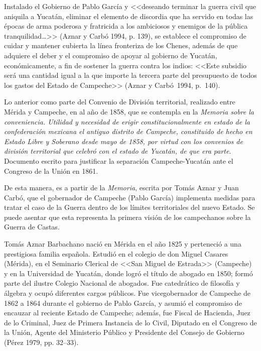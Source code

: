 Instalado el Gobierno de Pablo García y <<deseando terminar la guerra civil
que aniquila a Yucatán,  eliminar el elemento de discordia que ha servido
en todas las épocas de arma poderosa y fratricida a los ambiciosos y
enemigos de la pública tranquilidad\ldots>> (Aznar y Carbó 1994, p.
 139), se establece el compromiso de
cuidar y mantener cubierta la línea fronteriza de los Chenes, además de que
adquiere el deber y el compromiso de apoyar al gobierno de Yucatán,
económicamente, a fin de sostener la guerra contra los indios: <<Este
subsidio será una cantidad igual  a la que importe la tercera parte del
presupuesto de todos los gastos del Estado de Campeche>> (Aznar y Carbó~1994, 
p.~140).


Lo anterior como parte del Convenio de División territorial, realizado 
entre Mérida y Campeche,  en al año de 1858, que se contempla en la
\textit{Memoria sobre la conveniencia. Utilidad y
necesidad de erigir constitucionalmente en estado de la confederación
mexicana el antiguo distrito de Campeche, constituido de hecho en Estado
Libre y Soberano desde mayo de 1858, por virtud con los convenios de
división territorial que celebró con el estado de Yucatán, de que era
parte}. Documento  escrito para justificar la separación Campeche-Yucatán 
ante el Congreso de la Unión en 1861.


De esta manera, es a partir de la \textit{Memoria}, escrita por Tomás Aznar
y Juan Carbó, que el gobernador de Campeche (Pablo García) implementa
medidas para tratar el caso de la Guerra dentro de los límites
territoriales del nuevo Estado. Se puede
asentar que esta representa la primera visión de los campechanos sobre la
Guerra de Castas.


Tomás Aznar Barbachano nació en Mérida en el año 1825 y perteneció a una
prestigiosa familia española. Estudió en el colegio de don Miguel Casares
(Mérida), en el Seminario Clerical de <<San Miguel de Estrada>> (Campeche) y
en la Universidad de Yucatán, donde logró el título de  abogado en 1850;
formó parte del ilustre  Colegio Nacional de abogados. Fue catedrático de
filosofía y álgebra y ocupó diferentes cargos públicos. Fue vicegobernador
de Campeche de 1862 a 1864 durante el gobierno de Pablo García, y asumió el
compromiso de encauzar al reciente Estado de Campeche; además, fue Fiscal
de Hacienda,  Juez de lo Criminal, Juez de Primera Instancia de lo Civil,
Diputado en el Congreso de la Unión, Agente del Ministerio Público y
Presidente del Consejo de Gobierno (Pérez 1979, pp. 32--33).
\enlargethispage{1\baselineskip}
 

